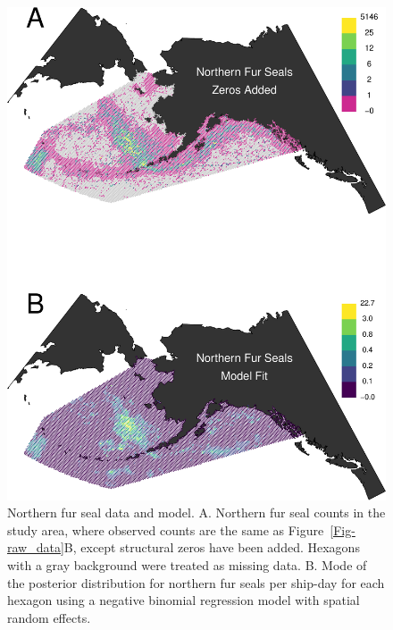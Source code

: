 \documentclass[11pt, titlepage]{article}
\begin{document}
\begin{spacing}{1.9}
\begin{flushleft}
\begin{figure}[H]
  \begin{center}
  \includegraphics[width=.75\linewidth]{figures/Fig-FurSealFit}
  \end{center}
  \caption{Northern fur seal data and model. A. Northern fur seal counts in the study area, where observed counts are the same as Figure~\ref{Fig-raw_data}B, except structural zeros have been added. Hexagons with a gray background were treated as missing data. B. Mode of the posterior distribution for northern fur seals per ship-day for each hexagon using a negative binomial regression model with spatial random effects.   \label{Fig-FurSealFit}}         
\end{figure} 


\end{flushleft}
\end{spacing}
\end{document}
